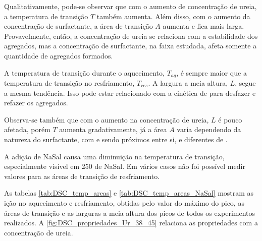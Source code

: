 	Qualitativamente, pode-se observar que com o aumento de concentração de ureia, a temperatura de transição \(T\) também aumenta. Além disso, com o aumento da concentração de surfactante, a área de transição \(A\) aumenta e fica mais larga. Provavelmente, então, a concentração de ureia se relaciona com a estabilidade dos agregados, mas a concentração de surfactante, na faixa estudada, afeta somente a quantidade de agregados formados. 
	
	A temperatura de transição durante o aquecimento, \(T_{aq}\), é sempre maior que a temperatura de transição no resfriamento, \(T_{res}\). A largura a meia altura, \(L\), segue a mesma tendência. Isso pode estar relacionado com a cinética de para desfazer e refazer os agregados. 
	
	Observa-se também que com o aumento na concentração de ureia, \(L\) é pouco afetada, porém \(T\) aumenta gradativamente, já a área \(A\) varia dependendo da natureza do surfactante, com \CTAB{} e \TTAB{} sendo próximos entre si, e diferentes de \DTAB.
	
	A adição de NaSal causa uma diminuição na temperatura de transição, especialmente visível em 250 \mM{} de NaSal. Em vários casos não foi possível medir valores para as áreas de transição de resfriamento.
	
	As tabelas \ref{tab:DSC_temp_areas} e \ref{tab:DSC_temp_areas_NaSal} mostram as ição no aquecimento e resfriamento, obtidas pelo valor do máximo do pico, as áreas de transição e as larguras a meia altura dos picos de todos os experimentos realizados. A \autoref{fig:DSC_propriedades_Ur_38_45} relaciona as propriedades com a concentração de ureia. %
	
